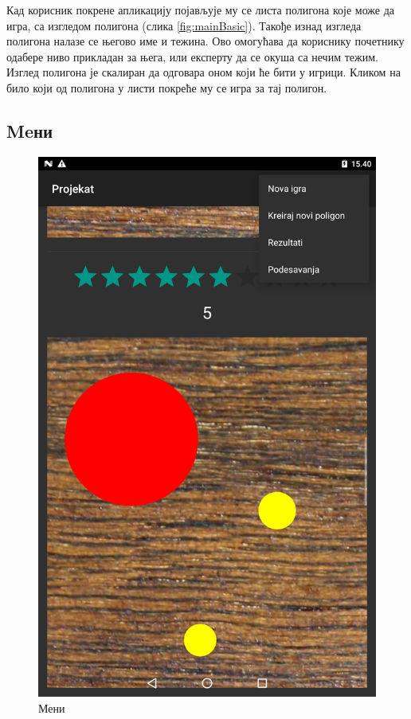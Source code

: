 Кад корисник покрене апликацију појављује му се листа полигона које може да игра, са изгледом полигона (слика \ref{fig:mainBasic}). Такође изнад изгледа полигона налазе се његово име и тежина. Ово омогућава да кориснику почетнику одабере ниво прикладан за њега, или експерту да се окуша са нечим тежим. Изглед полигона је скалиран да одговара оном који ће бити у игрици. Кликом на било који од полигона у листи покреће му се игра за тај полигон.

\subsection{Meни}
\begin{figure}[htb!]
\begin{center}
\includegraphics[scale=.1]{pictures/main/Menu}
\caption{Мени}\label{fig:mainMenu}
\end{center}
\end{figure}
